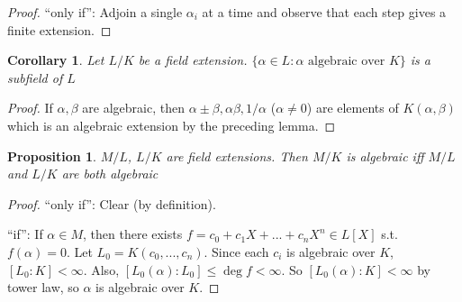 \documentclass{article}
\theoremstyle{definition}
\theoremstyle{remark}
\theoremstyle{plain}
\newtheorem{prop}[defn]{Proposition}
\newtheorem{crly}[defn]{Corollary}
\begin{document}
\begin{proof}
``only if'':
Adjoin a single $\alpha_i$ at a time and observe that each step gives a finite extension.
\end{proof}
\begin{crly}
    Let $L/K$ be a field extension. $\{\alpha\in L:\alpha\text{ algebraic over }K\}$ is a subfield of $L$
\end{crly}
\begin{proof}
    If $\alpha,\beta$ are algebraic, then $\alpha\pm\beta,\alpha\beta,1/\alpha$ ($\alpha\neq 0$) are elements of $K(\alpha,\beta)$ which is an algebraic extension by the preceding lemma.
\end{proof}
\begin{prop}
    $M/L$, $L/K$ are field extensions. Then $M/K$ is algebraic iff $M/L$ and $L/K$ are both algebraic
\end{prop}
\begin{proof}
    ``only if'': Clear (by definition).

    ``if'': If $\alpha\in M$, then there exists $f=c_0+c_1X+...+c_nX^n\in L[X]$ s.t. $f(\alpha)=0$. Let $L_0=K(c_0,...,c_n)$. Since each $c_i$ is algebraic over $K$, $[L_0:K]<\infty$. Also, $[L_0(\alpha):L_0]\le\deg f<\infty$. So $[L_0(\alpha):K]<\infty$ by tower law, so $\alpha$ is algebraic over $K$.
\end{proof}
\end{document}
